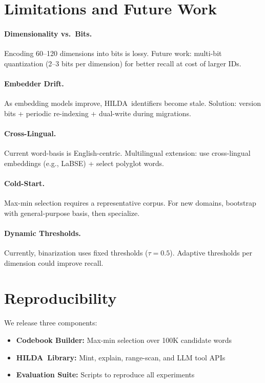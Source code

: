 \documentclass[11pt]{article}
\newcommand{\hilda}{\textsc{HILDA}}
\begin{document}
\section{Limitations and Future Work}

\paragraph{Dimensionality vs.\ Bits.} Encoding 60--120 dimensions into bits is lossy. Future work: multi-bit quantization (2--3 bits per dimension) for better recall at cost of larger IDs.

\paragraph{Embedder Drift.} As embedding models improve, \hilda\ identifiers become stale. Solution: version bits + periodic re-indexing + dual-write during migrations.

\paragraph{Cross-Lingual.} Current word-basis is English-centric. Multilingual extension: use cross-lingual embeddings (e.g., LaBSE) + select polyglot words.

\paragraph{Cold-Start.} Max-min selection requires a representative corpus. For new domains, bootstrap with general-purpose basis, then specialize.

\paragraph{Dynamic Thresholds.} Currently, binarization uses fixed thresholds ($\tau = 0.5$). Adaptive thresholds per dimension could improve recall.

\section{Reproducibility}

We release three components:
\begin{itemize}
  \item \textbf{Codebook Builder:} Max-min selection over 100K candidate words
  \item \textbf{\hilda\ Library:} Mint, explain, range-scan, and LLM tool APIs
  \item \textbf{Evaluation Suite:} Scripts to reproduce all experiments
\end{itemize}
\end{document}
